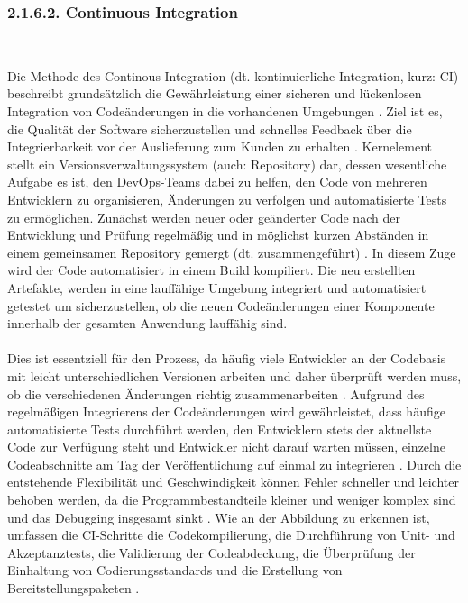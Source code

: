 \subsubsection{2.1.6.2. Continuous Integration} $~$

Die Methode des Continous Integration (dt. kontinuierliche Integration, kurz: CI) beschreibt grundsätzlich die Gewährleistung einer sicheren und lückenlosen Integration von Codeänderungen in die vorhandenen Umgebungen \cite[S. 266]{tokarski_strategische_2018}. Ziel ist es, die Qualität der Software sicherzustellen und schnelles Feedback über die Integrierbarkeit vor der Auslieferung zum Kunden zu erhalten \cite[S. 266]{tokarski_strategische_2018}. Kernelement stellt ein Versionsverwaltungssystem (auch: Repository) dar, dessen wesentliche Aufgabe es ist, den DevOps-Teams dabei zu helfen, den Code von mehreren Entwicklern zu organisieren, Änderungen zu verfolgen und automatisierte Tests zu ermöglichen. Zunächst werden neuer oder geänderter Code nach der Entwicklung und Prüfung regelmäßig und in möglichst kurzen Abständen in einem gemeinsamen Repository gemergt (dt. zusammengeführt) \cite[S. 13-16]{sharma_devops_2017}. In diesem Zuge wird der Code automatisiert in einem Build kompiliert. Die neu erstellten Artefakte, werden in eine lauffähige Umgebung integriert und automatisiert getestet um sicherzustellen, ob die neuen Codeänderungen einer Komponente innerhalb der gesamten Anwendung lauffähig sind.\\\\ Dies ist essentziell für den Prozess, da häufig viele Entwickler an der Codebasis mit leicht unterschiedlichen Versionen arbeiten und daher überprüft werden muss, ob die verschiedenen Änderungen richtig zusammenarbeiten \cite[S. 69]{verona_practical_2016}. Aufgrund des regelmäßigen Integrierens der Codeänderungen wird gewährleistet, dass häufige automatisierte Tests durchführt werden, den Entwicklern stets der aktuellste Code zur Verfügung steht und Entwickler nicht darauf warten müssen, einzelne Codeabschnitte am Tag der Veröffentlichung auf einmal zu integrieren \cite{thedev_eight_2019}. Durch die entstehende Flexibilität und Geschwindigkeit können Fehler schneller und leichter behoben werden, da die Programmbestandteile kleiner und weniger komplex sind und das Debugging insgesamt sinkt \cite{thedev_eight_2019}. Wie an der Abbildung zu erkennen ist, umfassen die CI-Schritte die Codekompilierung, die Durchführung von Unit- und Akzeptanztests, die Validierung der Codeabdeckung, die Überprüfung der Einhaltung von Codierungsstandards und die Erstellung von Bereitstellungspaketen \cite{fitzgerald_continuous_2014}. 

